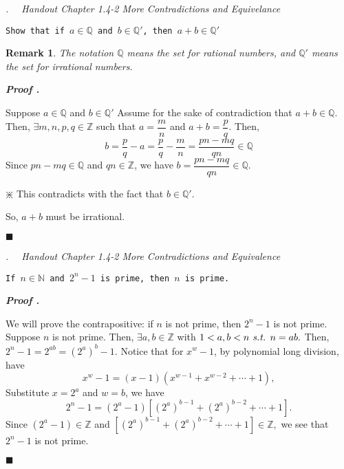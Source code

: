 \documentclass[11pt,letter]{article}
\newcounter{nq}[section]
\newcounter{np}[section]
\newtheorem*{rmk}{\indent Remark}
\newenvironment*{p}{\par\noindent\textbf{\textit{Proof \stepcounter{np}\thenp. }}\par}{\par\hfill $\blacksquare$\par}
\newenvironment*{q}[1]{\noindent\emph{\thesection.\stepcounter{nq}\thenq$\quad $ #1}\par\noindent\texttt}{}
\def\Z{{\mathbb{Z}}}
\def\Q{{\mathbb{Q}}}
\def\N{{\mathbb{N}}}
\def\st{\emph{ s.t. }}
\begin{document}
\begin{framed}\begin{q}
	{Handout Chapter 1.4-2 More Contradictions and Equivelance}
	{Show that if $a\in\Q$ and $b\in\Q'$, then $a+b\in\Q'$}
	\begin{rmk}
		The notation $\Q$ means the set for rational numbers, and $\Q'$ means the set for irrational numbers.
	\end{rmk}
\end{q}\end{framed}
\begin{p}
	Suppose $a\in\Q$ and $b\in\Q'$ Assume for the sake of contradiction that $a+b\in\Q$. Then, $\exists m,n,p,q\in\Z$ such that $a=\dfrac{m}{n}$ and $a+b=\dfrac{p}{q}.$ Then, \[b=\frac{p}{q}-a=\frac{p}{q}-\frac{m}{n}=\frac{pn-mq}{qn}\in\Q\] Since $pn-mq\in\Q$ and $qn\in\Z$, we have $b=\dfrac{pn-mq}{qn}\in\Q$.\par\begin{center}$\divideontimes$ This contradicts with the fact that $b\in\Q'$. \end{center} So, $a+b$ must be irrational. 
\end{p}

\begin{framed}\begin{q}
	{Handout Chapter 1.4-2 More Contradictions and Equivalence}
	{If $n\in\N$ and $2^n-1$ is prime, then $n$ is prime.}
\end{q}\end{framed}
\begin{p}
	We will prove the contrapositive: if $n$ is not prime, then $2^n-1$ is not prime. Suppose $n$ is not prime. Then, $\exists a,b\in\Z$ with $1<a,b<n\st n=ab.$ Then, $2^n-1=2^{ab}=\left(2^a\right)^b-1.$ Notice that for $x^w-1$, by polynomial long division, have \[x^w-1=(x-1)\left(x^{w-1}+x^{w-2}+\cdots+1\right),\] Substitute $x=2^a$ and $w=b$, we have \[2^n-1=\left(2^a-1\right)\left[\left(2^a\right)^{b-1}+\left(2^a\right)^{b-2}+\cdots+1\right].\] Since $\left(2^a-1\right)\in\Z$ and $\left[\left(2^a\right)^{b-1}+\left(2^a\right)^{b-2}+\cdots+1\right]\in\Z,$ we see that $2^n-1$ is not prime. 
\end{p}
\end{document}
